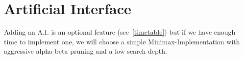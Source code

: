 \part{Artificial Interface}
Adding an A.I. is an optional feature (see~\ref{timetable}) but if we have enough time to implement one,
we will choose a simple Minimax-Implementation with aggressive alpha-beta pruning and a low search depth.
